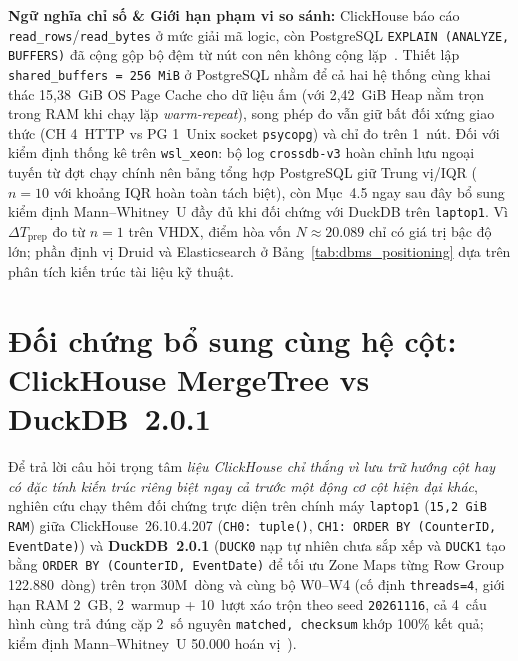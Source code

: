 \documentclass[13pt,a4paper]{report}
\begin{document}
\noindent\textbf{Ngữ nghĩa chỉ số \& Giới hạn phạm vi so sánh:} ClickHouse báo cáo \texttt{read\_\allowbreak{}rows}/\texttt{read\_\allowbreak{}bytes} ở mức giải mã logic, còn PostgreSQL \texttt{EXPLAIN (\allowbreak{}ANALYZE, BUFFERS)} đã cộng gộp bộ đệm từ nút con nên không cộng lặp~\cite{S10, P9}. Thiết lập \texttt{shared\_\allowbreak{}buffers = 256~MiB} ở PostgreSQL nhằm để cả hai hệ thống cùng khai thác 15,38~GiB OS Page Cache cho dữ liệu ấm (với 2,42~GiB Heap nằm trọn trong RAM khi chạy lặp \textit{warm-repeat}), song phép đo vẫn giữ bất đối xứng giao thức (CH 4~HTTP vs PG 1~Unix socket \texttt{psycopg}) và chỉ đo trên 1~nút. Đối với kiểm định thống kê trên \texttt{wsl\_\allowbreak{}xeon}: bộ log \texttt{crossdb-v3} hoàn chỉnh lưu ngoại tuyến từ đợt chạy chính nên bảng tổng hợp PostgreSQL giữ Trung vị/IQR ($n = 10$ với khoảng IQR hoàn toàn tách biệt), còn Mục~4.5 ngay sau đây bổ sung kiểm định Mann--Whitney~U đầy đủ khi đối chứng với DuckDB trên \texttt{laptop1}. Vì $\Delta T_{\text{prep}}$ đo từ $n = 1$ trên VHDX, điểm hòa vốn $N \approx 20.089$ chỉ có giá trị bậc độ lớn; phần định vị Druid và Elasticsearch ở Bảng~\ref{tab:dbms_positioning} dựa trên phân tích kiến trúc tài liệu kỹ thuật.

\section{Đối chứng bổ sung cùng hệ cột: ClickHouse MergeTree vs DuckDB~2.0.1}
Để trả lời câu hỏi trọng tâm \textit{liệu ClickHouse chỉ thắng vì lưu trữ hướng cột hay có đặc tính kiến trúc riêng biệt ngay cả trước một động cơ cột hiện đại khác}, nghiên cứu chạy thêm đối chứng trực diện trên chính máy \texttt{laptop1} (\texttt{15,2~GiB RAM}) giữa ClickHouse~26.10.4.207 (\texttt{CH0: tuple()}, \texttt{CH1: ORDER BY (\allowbreak{}CounterID, EventDate)}) và \textbf{DuckDB~2.0.1} (\texttt{DUCK0} nạp tự nhiên chưa sắp xếp và \texttt{DUCK1} tạo bằng \texttt{ORDER BY (\allowbreak{}CounterID, EventDate)} để tối ưu Zone Maps từng Row Group 122.880~dòng) trên trọn 30M~dòng và cùng bộ W0--W4 (cố định \texttt{threads=4}, giới hạn RAM 2~GB, 2~warmup + 10~lượt xáo trộn theo seed \texttt{20261116}, cả 4~cấu hình cùng trả đúng cặp 2~số nguyên \texttt{matched, checksum} khớp 100\% kết quả; kiểm định Mann--Whitney~U 50.000 hoán vị~\cite{M6}).
\end{document}
